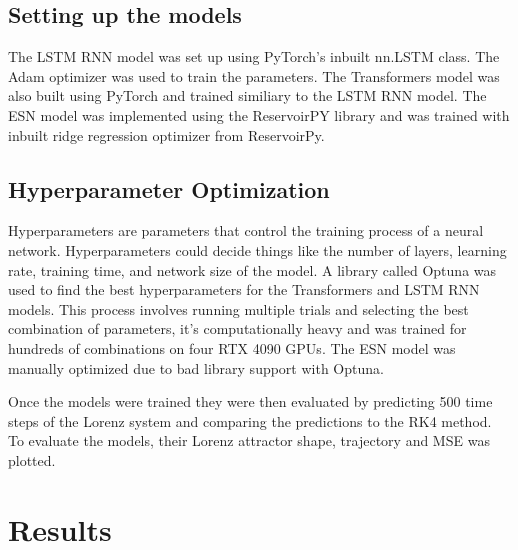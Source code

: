 \documentclass[11pt]{article}
\begin{document}
\subsection{Setting up the models}
The LSTM RNN model was set up using PyTorch's inbuilt nn.LSTM class. The Adam optimizer was used to train the parameters. The Transformers model was also built using PyTorch and trained similiary to the LSTM RNN model. The ESN model was implemented using the ReservoirPY library and was trained with inbuilt ridge regression optimizer from ReservoirPy.

\subsection{Hyperparameter Optimization}
Hyperparameters are parameters that control the training process of a neural network. Hyperparameters could decide things like the number of layers, learning rate, training time, and network size of the model. A library called Optuna was used to find the best hyperparameters for the Transformers and LSTM RNN models. This process involves running multiple trials and selecting the best combination of parameters, it's computationally heavy and was trained for hundreds of combinations on four RTX 4090 GPUs. The ESN model was manually optimized due to bad library support with Optuna.

Once the models were trained they were then evaluated by predicting 500 time steps of the Lorenz system and comparing the predictions to the RK4 method. To evaluate the models, their Lorenz attractor shape, trajectory and MSE
was plotted.

\section{Results}
\end{document}

